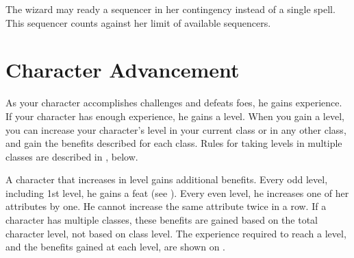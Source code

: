 The wizard may ready a sequencer in her contingency instead of a single spell.
This sequencer counts against her limit of available sequencers.

\section{Character Advancement}\label{Character Advancement}

As your character accomplishes challenges and defeats foes, he gains experience.
If your character has enough experience, he gains a level.
When you gain a level, you can increase your character's level in your current class or in any other class, and gain the benefits described for each class.
Rules for taking levels in multiple classes are described in , below.

A character that increases in level gains additional benefits.
Every odd level, including 1st level, he gains a feat (see ).
Every even level, he increases one of her attributes by one.
He cannot increase the same attribute twice in a row.
If a character has multiple classes, these benefits are gained based on the total character level, not based on class level.
The experience required to reach a level, and the benefits gained at each level, are shown on .

